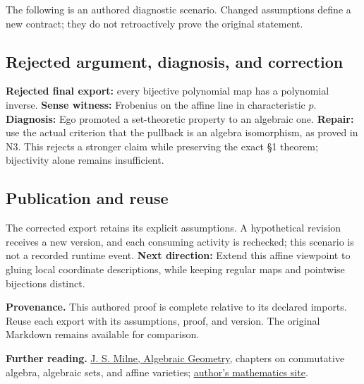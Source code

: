 \documentclass[preprint,12pt,aps,pra,showkeys,amsmath,amssymb,superscriptaddress,floatfix]{revtex4-2}
\theoremstyle{definition}
\theoremstyle{remark}
\begin{document}
The following is an authored diagnostic scenario. Changed assumptions
define a new contract; they do not retroactively prove the original
statement.

\subsection{Rejected argument, diagnosis, and correction}
\textbf{Rejected final export:} every bijective polynomial map has a
polynomial inverse. \textbf{Sense witness:} Frobenius on the affine line
in characteristic \(p\). \textbf{Diagnosis:} Ego promoted a
set-theoretic property to an algebraic one. \textbf{Repair:} use the
actual criterion that the pullback is an algebra isomorphism, as proved
in N3. This rejects a stronger claim while preserving the exact §1
theorem; bijectivity alone remains insufficient.

\subsection{Publication and reuse}
The corrected export retains its explicit assumptions. A hypothetical
revision receives a new version, and each consuming activity is
rechecked; this scenario is not a recorded runtime event. \textbf{Next
direction:} Extend this affine viewpoint to gluing local coordinate
descriptions, while keeping regular maps and pointwise bijections
distinct.

\par\medskip\begingroup\small\linespread{1.0}\selectfont\noindent\textbf{Provenance.} This authored proof is complete relative to its declared imports. Reuse
each export with its assumptions, proof, and version. The original
Markdown remains available for comparison.
\par\endgroup

\par\smallskip\begingroup\small\linespread{1.0}\selectfont\noindent\textbf{Further reading.} \href{https://www.jmilne.org/math/CourseNotes/ag.html}{J. S. Milne,
Algebraic Geometry}, chapters on commutative algebra, algebraic sets,
and affine varieties; \href{https://www.jmilne.org/math/}{author's
mathematics site}.\par\endgroup
\end{document}
